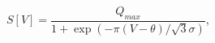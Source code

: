 \documentclass[12pt]{article}
\begin{document}
      $\displaystyle S[V] = \dfrac{Q_{max}}{1 + \exp{(-\pi(V - \theta) / \sqrt{3} \sigma)}}$,\\   
    
  
\end{document}
